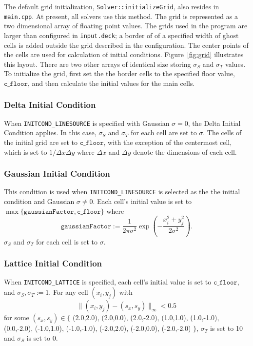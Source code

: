 \documentclass{article}
\newcommand{\main}{\texttt{main.cpp}\xspace}
\newcommand{\inputdeck}{\texttt{input.deck}\xspace}
\newcommand{\floor}{\ensuremath{\mathtt{c\_floor}}\xspace}
\newcommand{\assign}{\ensuremath{\mathrel{\texttt{:=}}}}
\begin{document}
The default grid initialization, \texttt{Solver::initializeGrid}, also resides
in \main. At present, all solvers use this
method. The grid is represented as a two dimensional array of floating point values.
The grids used in the program are larger than configured in \inputdeck; a border of
of a specified width of ghost cells is added outside the grid described in the
configuration. The center points of the cells are used for calculation of
initial conditions. Figure~\ref{fig:grid} illustrates this layout.
There are two other arrays of identical size storing $\sigma_S$ and $\sigma_T$
values. To initialize the grid, first set the the border cells to the
specified floor value, \floor, and then calculate the initial values for the
main cells.

\subsubsection{Delta Initial Condition}
\label{init:delta}
When \texttt{INITCOND\_LINESOURCE} is specified with Gaussian $\sigma=0$, the
Delta Initial Condition applies. In this case, $\sigma_S$ and $\sigma_T$ for each
cell are set to $\sigma$. The cells of the initial grid are set to \floor,
with the exception of the centermost cell, %
which is set to $1 / \Delta x \Delta y$ where $\Delta x$ and $\Delta y$ denote the
dimensions of each cell.

\subsubsection{Gaussian Initial Condition}
\label{init:gauss}
This condition is used when \texttt{INITCOND\_LINESOURCE} is selected as the the
initial condition and Gaussian $\sigma \neq 0$. Each cell's initial value is
set to $\max \{\texttt{gaussianFactor}, \floor\}$ where
\begin{equation}
    \mathtt{gaussianFactor} \assign \frac{1}{2\pi\sigma^2}
        \exp \left(- \frac{x_i^2 + y_j^2}{2\sigma^2}\right).
\end{equation}
$\sigma_S$ and $\sigma_T$ for each cell is set to $\sigma$.

\subsubsection{Lattice Initial Condition}
\label{init:lattice}
When \texttt{INITCOND\_LATTICE} is specified, each cell's initial value is set to
\floor, and $\sigma_S,\sigma_T \assign 1$. For any cell $(x_i,y_j)$ with
\begin{equation}
    \|(x_i,y_j) - (s_x, s_y)\|_\infty < 0.5
\end{equation}    
for some $(s_x,s_y) \in \{$
    (2.0,2.0), (2.0,0.0), (2.0,-2.0), (1.0,1.0), (1.0,-1.0),
    (0.0,-2.0), (-1.0,1.0), (-1.0,-1.0), (-2.0,2.0), (-2.0,0.0), (-2.0,-2.0)
$\}$, $\sigma_T$ is set to 10 and $\sigma_S$ is set to 0.
\end{document}
